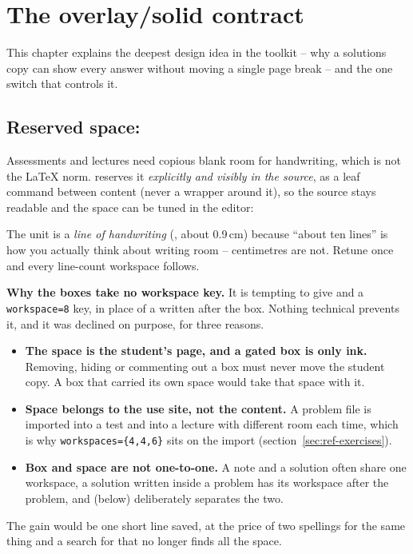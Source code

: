 \section{The overlay/solid contract}\label{sec:overlay}

This chapter explains the deepest design idea in the toolkit -- why a
solutions copy can show every answer without moving a single page break --
and the one switch that controls it.

\subsection{Reserved space: }

Assessments and lectures need copious blank room for handwriting, which is
not the LaTeX norm.  reserves it \emph{explicitly and visibly
in the source}, as a leaf command between content (never a wrapper around
it), so the source stays readable and the space can be tuned in the editor:

\begin{manexsource}
\workspace            %
\workspace[12]        %
\workspace[halfpage]  %
\workspace[fullpage]  %
\workspace*           %
\end{manexsource}

The unit is a \emph{line of handwriting} (, about
0.9\,cm) because ``about ten lines'' is how you actually think about writing
room -- centimetres are not. Retune  once and
every line-count workspace follows.

\textbf{Why the boxes take no workspace key.}
It is tempting to give  and  a \texttt{workspace=8} key, in place of a  written after the box.
Nothing technical prevents it, and it was declined on purpose, for three reasons.
\begin{itemize}
  \item \textbf{The space is the student's page, and a gated box is only ink.}
    Removing, hiding or commenting out a box must never move the student copy.
    A box that carried its own space would take that space with it.
  \item \textbf{Space belongs to the use site, not the content.}
    A problem file is imported into a test and into a lecture with different room each time, which is why \texttt{workspaces=\{4,4,6\}} sits on the import (section~\ref{sec:ref-exercises}).
  \item \textbf{Box and space are not one-to-one.}
    A note and a solution often share one workspace, a solution written inside a problem has its workspace after the problem, and  (below) deliberately separates the two.
\end{itemize}
The gain would be one short line saved, at the price of two spellings for the same thing and a search for  that no longer finds all the space.

